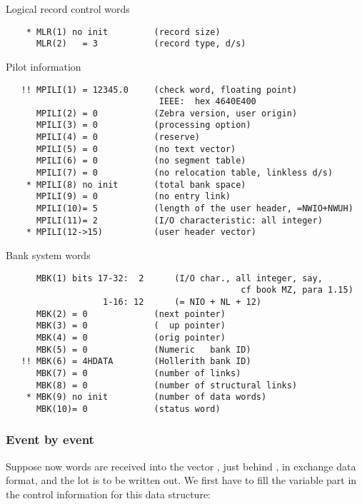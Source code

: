 Logical record control words

\begin{verbatim}
    * MLR(1) no init         (record size)
      MLR(2)   = 3           (record type, d/s)
\end{verbatim}

Pilot information

\begin{verbatim}
   !! MPILI(1) = 12345.0     (check word, floating point)
                              IEEE:  hex 4640E400
      MPILI(2) = 0           (Zebra version, user origin)
      MPILI(3) = 0           (processing option)
      MPILI(4) = 0           (reserve)
      MPILI(5) = 0           (no text vector)
      MPILI(6) = 0           (no segment table)
      MPILI(7) = 0           (no relocation table, linkless d/s)
    * MPILI(8) no init       (total bank space)
      MPILI(9) = 0           (no entry link)
      MPILI(10)= 5           (length of the user header, =NWIO+NWUH)
      MPILI(11)= 2           (I/O characteristic: all integer)
    * MPILI(12->15)          (user header vector)
\end{verbatim}

Bank system words

\begin{verbatim}
      MBK(1) bits 17-32:  2      (I/O char., all integer, say,
                                              cf book MZ, para 1.15)
                   1-16: 12      (= NIO + NL + 12)
      MBK(2) = 0             (next pointer)
      MBK(3) = 0             (  up pointer)
      MBK(4) = 0             (orig pointer)
      MBK(5) = 0             (Numeric   bank ID)
   !! MBK(6) = 4HDATA        (Hollerith bank ID)
      MBK(7) = 0             (number of links)
      MBK(8) = 0             (number of structural links)
    * MBK(9) no init         (number of data words)
      MBK(10)= 0             (status word)
\end{verbatim}

\subsubsection*{Event by event}

Suppose now  words are received into the vector ,
just behind , in exchange data format, and the lot is to be
written out. We first have to fill the variable part in the control
information for this data structure:

